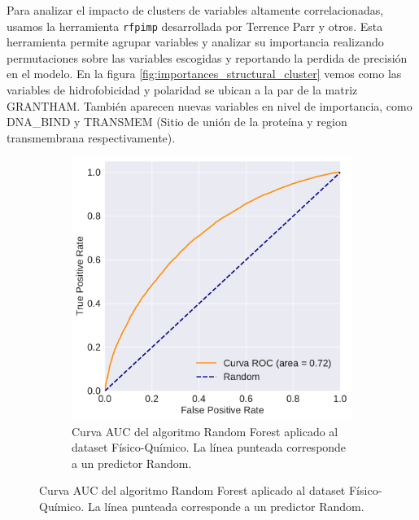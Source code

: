Para analizar el impacto de clusters de variables altamente correlacionadas, usamos la herramienta \texttt{rfpimp} desarrollada por Terrence Parr y otros. Esta herramienta permite agrupar variables y analizar su importancia realizando permutaciones sobre las variables escogidas y reportando la perdida de precisión en el modelo. En la figura \ref{fig:importances_structural_cluster} vemos como las variables de hidrofobicidad y polaridad se ubican a la par de la matriz GRANTHAM. También aparecen nuevas variables en nivel de importancia, como DNA\_BIND y TRANSMEM (Sitio de unión de la proteína y region transmembrana respectivamente).


\pagebreak

\begin{figure}[H]
\centering
\begin{subfigure}[b]{0.7\textwidth}
    \centering
    \includegraphics[width=\textwidth]{documents/latex/figures/3/structural/auc_structural.pdf}
    \caption{Curva AUC del algoritmo Random Forest aplicado al dataset Físico-Químico. La línea punteada corresponde a un predictor Random.}
    \label{fig:auc_structural}
\end{subfigure}

\hfill
\hfill


\end{figure}
